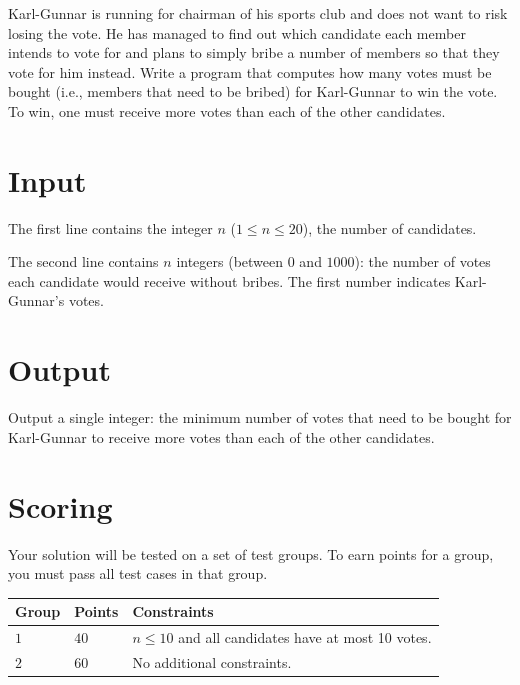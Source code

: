 
Karl-Gunnar is running for chairman of his sports club and does not want to risk losing the vote.
He has managed to find out which candidate each member intends to vote for and plans to simply bribe a number of members so that they vote for him instead. Write a program that computes how many votes must be bought (i.e., members that need to be bribed) for Karl-Gunnar to win the vote. To win, one must receive more votes than each of the other candidates.

\section*{Input}
The first line contains the integer $n$ ($1 \le n \le 20$), the number of candidates.

The second line contains $n$ integers (between $0$ and $1000$): the number of votes each candidate would receive without bribes.
The first number indicates Karl-Gunnar's votes.

\section*{Output}

Output a single integer: the minimum number of votes that need to be bought for Karl-Gunnar to receive more votes than each of the other candidates.

\section*{Scoring}
Your solution will be tested on a set of test groups.
To earn points for a group, you must pass all test cases in that group.

\noindent
\begin{tabular}{| l | l | p{12cm} |}
  \hline
  \textbf{Group} & \textbf{Points} & \textbf{Constraints} \\ \hline
  $1$    & $40$       & $n \leq 10$ and all candidates have at most 10 votes. \\ \hline
  $2$    & $60$       & No additional constraints. \\ \hline
\end{tabular}
